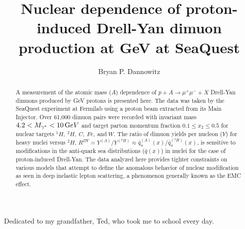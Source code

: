 \documentclass[edeposit,fullpage]{uiucthesis2009}
\begin{document}
\title{Nuclear dependence of proton-induced Drell-Yan dimuon production at \unit[120]{GeV} at SeaQuest}
\author{Bryan P. Dannowitz}
\phdthesis
{}
\maketitle

\frontmatter

\begin{abstract}
A measurement of the atomic mass ($A$) dependence of $p+A\rightarrow\mu^+\mu^- + X$ Drell-Yan dimuons produced by \unit[120]{GeV} protons is presented here. The data was taken by the SeaQuest experiment at Fermilab using a proton beam extracted from its Main Injector. Over 61,000 dimuon pairs were recorded with invariant mass $4.2 < M_{\gamma^*} < \unit[10] GeV$ and target parton momentum fraction $0.1\leq x_2 \leq 0.5$ for nuclear targets $^1H,\ ^2H,\ C,\ Fe,\ $and$\ W$. The ratio of dimuon yields per nucleon ($Y$) for heavy nuclei versus $^2H$, $R^{DY} = Y^{(A)} / Y^{(^2H)} \approx \bar{q}_u^{(A)}(x)/\bar{q}_u^{(^2H)}(x)$, is sensitive to modifications in the anti-quark sea distributions ($\bar{q}(x)$) in nuclei for the case of proton-induced Drell-Yan. The data analyzed here provides tighter constraints on various models that attempt to define the anomalous behavior of nuclear modification as seen in deep inelastic lepton scattering, a phenomenon generally known as the EMC effect.

\end{abstract}


\begin{dedication}
Dedicated to my grandfather, Ted, who took me to school every day.
\end{dedication}

\end{document}
